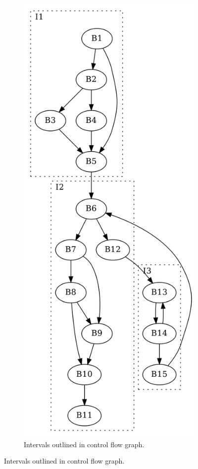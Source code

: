 \documentclass[aspectratio=1610]{beamer}
\begin{document}
\begin{frame}
\begin{figure}[htbp]
\begin{subfigure}[ht]{0.40\textwidth}
			\includegraphics[height=0.75\textheight]{inc/methods/interval/G_1.png}
			\caption{Intervals outlined in control flow graph.}
		\end{subfigure}
	\end{figure}
\end{frame}
\end{document}
